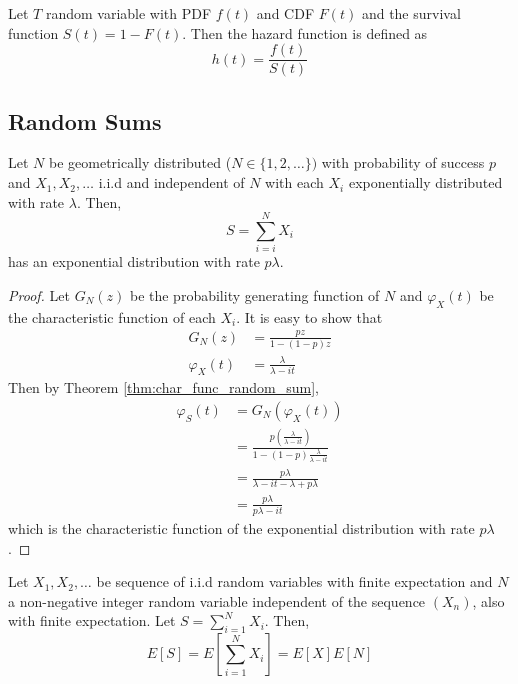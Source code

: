 \begin{defn}\cite{ross1996stochastic}
Let $T$ random variable with PDF $f(t)$ and CDF $F(t)$ and the survival function $S(t) = 1 - F(t)$.
Then the hazard function is defined as
$$
h(t) = \frac{f(t)}{S(t)}
$$
\end{defn}

\subsection{Random Sums}

\begin{theorem} \label{thm:geom_sum_exp}
Let $N$ be geometrically distributed ($N \in \{1,2,\ldots\})$ with probability of success $p$ and $X_1,X_2,\ldots$ i.i.d and independent of $N$ with each $X_i$ exponentially distributed with rate $\lambda$.
Then,
$$
S = \sum_{i = i}^N X_i
$$
has an exponential distribution with rate $p \lambda$.
\end{theorem}

\begin{proof}
Let $G_N(z)$ be the probability generating function of $N$ and $\varphi_X(t)$ be the characteristic function of each $X_i$.
It is easy to show that
\begin{align*}
    G_N(z) &= \frac{pz}{1 - (1 - p)z}\\
    \varphi_X(t) &= \frac{\lambda}{\lambda - it}
\end{align*}
Then by Theorem \ref{thm:char_func_random_sum},
\begin{align*}
    \varphi_S(t) &= G_N(\varphi_X(t))\\
    &= \frac{
        p \left( \frac{\lambda}{\lambda - it} \right)
        } {
        1 - (1 - p) \frac{\lambda}{\lambda - it}
        }\\
    &= \frac{
        p \lambda
    } {
        \lambda - it - \lambda + p \lambda
    }\\
    &= \frac{
        p \lambda
    } {
        p \lambda - it
    }
\end{align*}
which is the characteristic function of the exponential distribution with rate $p \lambda$.
\end{proof}

\begin{theorem}\label{thm:random_sum_ev}
Let $X_1, X_2, \ldots$ be sequence of i.i.d random variables with finite expectation and $N$ a non-negative integer random variable independent of the sequence $(X_n)$, also with finite expectation.
Let $S = \sum_{i = 1}^N X_i$.
Then,
$$
E[ S ] = E\left[\sum_{i = 1}^N X_i\right] = E[X] E[N]
$$
\end{theorem}

